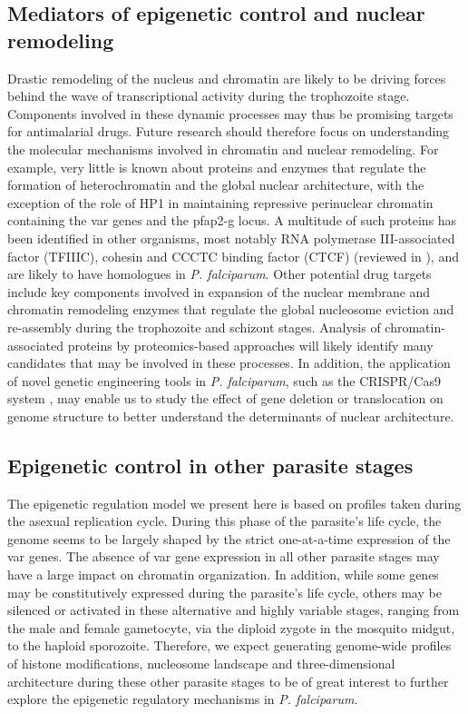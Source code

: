 \subsection{Mediators of epigenetic control and nuclear remodeling}

Drastic remodeling of the nucleus and chromatin are likely to be driving
forces behind the wave of transcriptional activity during the trophozoite
stage. Components involved in these dynamic processes may thus be promising
targets for antimalarial drugs. Future research should therefore focus on
understanding the molecular mechanisms involved in chromatin and nuclear
remodeling. For example, very little is known about proteins and enzymes that
regulate the formation of heterochromatin and the global nuclear architecture,
with the exception of the role of HP1 in maintaining repressive perinuclear
chromatin containing the var genes and the pfap2-g locus. A multitude of such
proteins has been identified in other organisms, most notably RNA polymerase
III-associated factor (TFIIIC), cohesin and CCCTC binding factor (CTCF)
(reviewed in \citep{gomez-diaz:architectural}), and are likely 
to have homologues in \textit{P.
falciparum}. Other
potential drug targets include key components involved in expansion of the
nuclear membrane and chromatin remodeling enzymes that regulate the global
nucleosome eviction and re-assembly during the trophozoite and schizont
stages. Analysis of chromatin-associated proteins by proteomics-based
approaches will likely identify many candidates that may be involved in these
processes. In addition, the application of novel genetic engineering tools in
\textit{P. falciparum}, such as the CRISPR/Cas9 system \citep{ghorbal:genome,
zhang:efficient, wagner:efficient}, may enable us to study
the effect of gene deletion or translocation on genome structure to better
understand the determinants of nuclear architecture.

\subsection{Epigenetic control in other parasite stages}
The epigenetic regulation model we present here is based on profiles taken
during the asexual replication cycle. During this phase of the parasite’s life
cycle, the genome seems to be largely shaped by the strict one-at-a-time
expression of the var genes. The absence of var gene expression in all other
parasite stages may have a large impact on chromatin organization. In
addition, while some genes may be constitutively expressed during the
parasite’s life cycle, others may be silenced or activated in these
alternative and highly variable stages, ranging from the male and female
gametocyte, via the diploid zygote in the mosquito midgut, to the haploid
sporozoite. Therefore, we expect generating genome-wide profiles of histone
modifications, nucleosome landscape and three-dimensional architecture during
these other parasite stages to be of great interest to further explore the
epigenetic regulatory mechanisms in \textit{P. falciparum}. 

